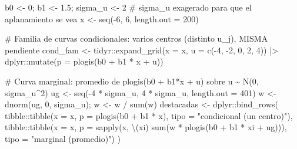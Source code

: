 \documentclass[
  letterpaper,
  DIV=11,
  numbers=noendperiod]{scrartcl}
\newenvironment{Shaded}{\begin{snugshade}}{\end{snugshade}}
\newcommand{\AttributeTok}[1]{\textcolor[rgb]{0.40,0.45,0.13}{#1}}
\newcommand{\CommentTok}[1]{\textcolor[rgb]{0.37,0.37,0.37}{#1}}
\newcommand{\DecValTok}[1]{\textcolor[rgb]{0.68,0.00,0.00}{#1}}
\newcommand{\FloatTok}[1]{\textcolor[rgb]{0.68,0.00,0.00}{#1}}
\newcommand{\FunctionTok}[1]{\textcolor[rgb]{0.28,0.35,0.67}{#1}}
\newcommand{\NormalTok}[1]{\textcolor[rgb]{0.00,0.23,0.31}{#1}}
\newcommand{\OtherTok}[1]{\textcolor[rgb]{0.00,0.23,0.31}{#1}}
\newcommand{\SpecialCharTok}[1]{\textcolor[rgb]{0.37,0.37,0.37}{#1}}
\newcommand{\StringTok}[1]{\textcolor[rgb]{0.13,0.47,0.30}{#1}}
\begin{document}
\begin{Shaded}
\begin{Highlighting}[]
\NormalTok{b0 }\OtherTok{\textless{}{-}} \DecValTok{0}\NormalTok{; b1 }\OtherTok{\textless{}{-}} \FloatTok{1.5}\NormalTok{; sigma\_u }\OtherTok{\textless{}{-}} \DecValTok{2}          \CommentTok{\# sigma\_u exagerado para que el aplanamiento se vea}
\NormalTok{x  }\OtherTok{\textless{}{-}} \FunctionTok{seq}\NormalTok{(}\SpecialCharTok{{-}}\DecValTok{6}\NormalTok{, }\DecValTok{6}\NormalTok{, }\AttributeTok{length.out =} \DecValTok{200}\NormalTok{)}

\CommentTok{\# Familia de curvas condicionales: varios centros (distinto u\_j), MISMA pendiente}
\NormalTok{cond\_fam }\OtherTok{\textless{}{-}}\NormalTok{ tidyr}\SpecialCharTok{::}\FunctionTok{expand\_grid}\NormalTok{(}\AttributeTok{x =}\NormalTok{ x, }\AttributeTok{u =} \FunctionTok{c}\NormalTok{(}\SpecialCharTok{{-}}\DecValTok{4}\NormalTok{, }\SpecialCharTok{{-}}\DecValTok{2}\NormalTok{, }\DecValTok{0}\NormalTok{, }\DecValTok{2}\NormalTok{, }\DecValTok{4}\NormalTok{)) }\SpecialCharTok{|\textgreater{}}
\NormalTok{  dplyr}\SpecialCharTok{::}\FunctionTok{mutate}\NormalTok{(}\AttributeTok{p =} \FunctionTok{plogis}\NormalTok{(b0 }\SpecialCharTok{+}\NormalTok{ b1 }\SpecialCharTok{*}\NormalTok{ x }\SpecialCharTok{+}\NormalTok{ u))}

\CommentTok{\# Curva marginal: promedio de plogis(b0 + b1*x + u) sobre u \textasciitilde{} N(0, sigma\_u\^{}2)}
\NormalTok{ug }\OtherTok{\textless{}{-}} \FunctionTok{seq}\NormalTok{(}\SpecialCharTok{{-}}\DecValTok{4} \SpecialCharTok{*}\NormalTok{ sigma\_u, }\DecValTok{4} \SpecialCharTok{*}\NormalTok{ sigma\_u, }\AttributeTok{length.out =} \DecValTok{401}\NormalTok{)}
\NormalTok{w  }\OtherTok{\textless{}{-}} \FunctionTok{dnorm}\NormalTok{(ug, }\DecValTok{0}\NormalTok{, sigma\_u); w }\OtherTok{\textless{}{-}}\NormalTok{ w }\SpecialCharTok{/} \FunctionTok{sum}\NormalTok{(w)}
\NormalTok{destacadas }\OtherTok{\textless{}{-}}\NormalTok{ dplyr}\SpecialCharTok{::}\FunctionTok{bind\_rows}\NormalTok{(}
\NormalTok{  tibble}\SpecialCharTok{::}\FunctionTok{tibble}\NormalTok{(}\AttributeTok{x =}\NormalTok{ x, }\AttributeTok{p =} \FunctionTok{plogis}\NormalTok{(b0 }\SpecialCharTok{+}\NormalTok{ b1 }\SpecialCharTok{*}\NormalTok{ x),}
                 \AttributeTok{tipo =} \StringTok{"condicional (un centro)"}\NormalTok{),}
\NormalTok{  tibble}\SpecialCharTok{::}\FunctionTok{tibble}\NormalTok{(}\AttributeTok{x =}\NormalTok{ x, }\AttributeTok{p =} \FunctionTok{sapply}\NormalTok{(x, \textbackslash{}(xi) }\FunctionTok{sum}\NormalTok{(w }\SpecialCharTok{*} \FunctionTok{plogis}\NormalTok{(b0 }\SpecialCharTok{+}\NormalTok{ b1 }\SpecialCharTok{*}\NormalTok{ xi }\SpecialCharTok{+}\NormalTok{ ug))),}
                 \AttributeTok{tipo =} \StringTok{"marginal (promedio)"}\NormalTok{)}
\NormalTok{)}


\end{Highlighting}
\end{Shaded}
\end{document}
